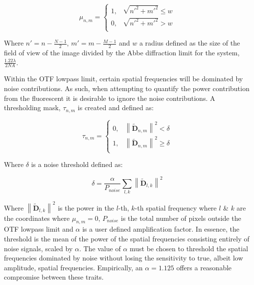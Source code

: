 \begin{equation}\label{eq:circular_mask}
\mu_{n,m} = 
\begin{cases}
1, & \sqrt{n'^{2} + m'^{2}} \le w\\
0, & \sqrt{n'^{2} + m'^{2}} > w\\ 
\end{cases}
\end{equation}

Where $n' = n - \frac{N-1}{2}$, $m' = m - \frac{M-1}{2}$ and $w$ a radius 
defined as the size of the field of view of the image divided by the Abbe
diffraction limit for the system, $\frac{1.22\lambda}{2NA}$.\cite{abbe1873beitrage} 

Within the OTF lowpass limit, certain spatial frequencies will be dominated
by noise contributions. As such, when attempting to quantify the power 
contribution from the fluorescent it is desirable to ignore the noise
contributions. A thresholding mask, $\tau_{n,m}$ is created and defined as:

\begin{equation}\label{eq:noise_threshold_mask}
\tau_{n,m} = 
\begin{cases}
0, & \left\| \tilde{\textbf{D}}_{n,m} \right\|^2 < \delta\\
1, & \left\| \tilde{\textbf{D}}_{n,m} \right\|^2 \ge \delta\\ 
\end{cases}
\end{equation}

Where $\delta$ is a noise threshold defined as:

\begin{equation}\label{eq:noise_threshold}
\delta = \frac{\alpha}{P_{noise}}\sum\limits_{l,k}{\left\| \tilde{\textbf{D}}_{l,k} \right\|^2}
\end{equation}

Where $\left\| \tilde{\textbf{D}}_{l,k} \right\|^2$ is the power in the 
$l$-th, $k$-th spatial frequency where $l$ \& $k$ are the coordinates 
where $\mu_{n,m} = 0$, $P_{noise}$ is the total number of pixels 
outside the OTF lowpass limit and $\alpha$ is a user defined 
amplification factor. In essence, the threshold is the mean of the
power of the spatial frequencies consisting entirely of noise signals,
scaled by $\alpha$.	The value of $\alpha$ must be chosen to threshold
the spatial frequencies dominated by noise without losing the sensitivity
to true, albeit low amplitude, spatial frequencies. Empirically, an 
$\alpha = 1.125$ offers a reasonable compromise between these traits.

